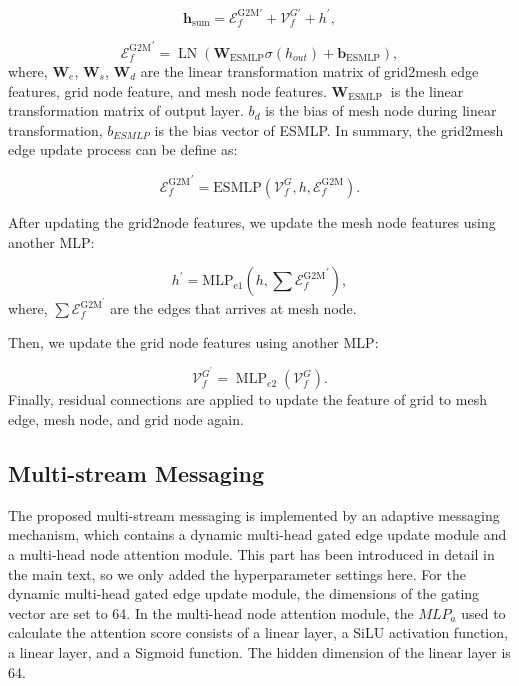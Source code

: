     \begin{equation}
        \mathbf{h}_{\mathrm{sum}}=\mathcal{E}_f^{\mathrm{G} 2 \mathrm{M} \prime}+\mathcal{V}_f^{G \prime}+h^{\prime},
    \end{equation}

    \begin{equation}
        {\mathcal{E}^{\mathrm{G} 2 \mathrm{M}}_f}^{\prime}=\operatorname{LN}\left(\mathbf{W}_{\mathrm{ESMLP}} \sigma\left(h_{out}\right)+\mathbf{b}_{\mathrm{ESMLP}}\right),
    \end{equation}
    where, $\mathbf{W}_e$, $\mathbf{W}_s$, $\mathbf{W}_d$ are the linear transformation matrix of grid2mesh edge features, grid node feature, and mesh node features. $\mathbf{W}_{\text {ESMLP }}$ is the linear transformation matrix of output layer. $b_d$ is the bias of mesh node during linear transformation, $b_{ESMLP}$ is the bias vector of ESMLP. In summary, the grid2mesh edge update process can be define as:
    
    \begin{equation}
         {\mathcal{E}^{\mathrm{G} 2 \mathrm{M}}_f}^{\prime} = \mathrm{ESMLP}(\mathcal{V}_f^G, h, \mathcal{E}^{\mathrm{G} 2 \mathrm{M}}_f).
    \end{equation}

    After updating the grid2node features, we update the mesh node features using another MLP:


    \begin{equation}
        h^{\prime} = \mathrm{MLP_{e1}}(h, \sum{\mathcal{E}^{\mathrm{G}2\mathrm{M}}_f}^{\prime}),
    \end{equation}
    where, $\sum \mathcal{E}_f^{\mathrm{G} 2 \mathrm{M}^{\prime}}$ are the edges that arrives at mesh node.

    Then, we update the grid node features using another MLP:

    \begin{equation}
\mathcal{V}_f^{G^{\prime}}=\operatorname{MLP}_{e2}\left(\mathcal{V}_f^G\right).
    \end{equation}
    Finally, residual connections are applied to update the feature of grid to mesh edge, mesh node, and grid node again.

\subsection{Multi-stream Messaging}
    The proposed multi-stream messaging is implemented by an adaptive messaging mechanism, which contains a dynamic multi-head gated edge update module and a multi-head node attention module. This part has been introduced in detail in the main text, so we only added the hyperparameter settings here. For the dynamic multi-head gated edge update module, the dimensions of the gating vector are set to 64. In the multi-head node attention module, the $MLP_a$ used to calculate the attention score consists of a linear layer, a SiLU activation function, a linear layer, and a Sigmoid function. The hidden dimension of the linear layer is 64.
